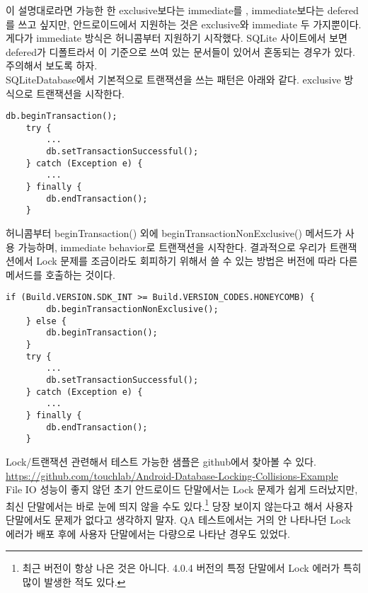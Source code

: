 이 설명대로라면 가능한 한 exclusive보다는 immediate를 , immediate보다는 defered를 쓰고 싶지만, 
안드로이드에서 지원하는 것은 exclusive와 immediate 두 가지뿐이다. 게다가 immediate 방식은 허니콤부터 지원하기 시작했다.
SQLite 사이트에서 보면 defered가 디폴트라서 이 기준으로 쓰여 있는 문서들이 있어서 혼동되는 경우가 있다. 주의해서 보도록 하자.\\

SQLiteDatabase에서 기본적으로 트랜잭션을 쓰는 패턴은 아래와 같다. 
exclusive 방식으로 트랜잭션을 시작한다.
\begin{lstlisting}[frame=single] 
	db.beginTransaction();
   	try {
     	...
     	db.setTransactionSuccessful();
	} catch (Exception e) {
		...
   	} finally {
     	db.endTransaction();
   	}
\end{lstlisting}

허니콤부터 beginTransaction() 외에 beginTransactionNonExclusive() 메서드가 사용 가능하며, immediate behavior로 트랜잭션을 시작한다.
결과적으로 우리가 트랜잭션에서 Lock 문제를 조금이라도 회피하기 위해서 쓸 수 있는 방법은 버전에 따라 다른 메서드를 호출하는 것이다.
\begin{lstlisting}[frame=single] 
	if (Build.VERSION.SDK_INT >= Build.VERSION_CODES.HONEYCOMB) {
		db.beginTransactionNonExclusive();
	} else {
		db.beginTransaction();
	}
   	try {
     	...
     	db.setTransactionSuccessful();
	} catch (Exception e) {
		...
   	} finally {
     	db.endTransaction();
   	}
\end{lstlisting}

Lock/트랜잭션 관련해서 테스트 가능한 샘플은 github에서 찾아볼 수 있다.\\
\url{https://github.com/touchlab/Android-Database-Locking-Collisions-Example}\\

File IO 성능이 좋지 않던 초기 안드로이드 단말에서는 Lock 문제가 쉽게 드러났지만, 최신 단말에서는 바로 눈에 띄지 않을 수도 있다.\footnote{최근 버전이 항상 나은 것은 아니다. 4.0.4 버전의 특정 단말에서 Lock 에러가 특히 많이 발생한 적도 있다.} 당장 보이지 않는다고 해서 사용자 단말에서도 문제가 없다고 생각하지 말자. QA 테스트에서는 거의 안 나타나던 Lock 에러가 배포 후에 사용자 단말에서는 다량으로 나타난 경우도 있었다.\\

